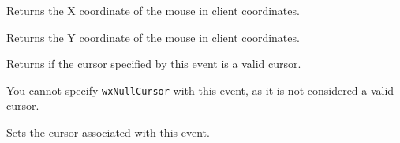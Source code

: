 Returns the X coordinate of the mouse in client coordinates.


\label{wxsetcursoreventgety}


Returns the Y coordinate of the mouse in client coordinates.


\label{wxsetcursoreventhascursor}


Returns \true if the cursor specified by this event is a valid cursor.


You cannot specify \texttt{wxNullCursor} with this event, as it is not
considered a valid cursor.


\label{wxsetcursoreventsetcursor}


Sets the cursor associated with this event.


